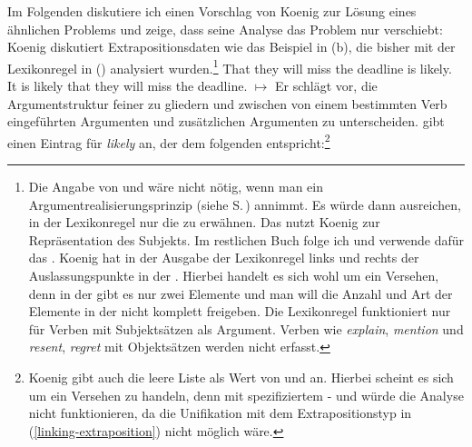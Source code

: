 Im Folgenden diskutiere ich einen Vorschlag von Koenig zur Lösung eines ähnlichen Problems
und zeige, dass seine Analyse das Problem nur verschiebt:
Koenig diskutiert Extrapositionsdaten wie das Beispiel in (b), die bisher mit der
Lexikonregel in () analysiert wurden.\footnote{\label{fn-Extrapositionslexikonregel}%
  Die Angabe von \subj und \comps wäre nicht nötig, wenn man ein
  Argumentrealisierungsprinzip (siehe S.\,\pageref{Prinzip-Argumentrealisierung-einfach})
  annimmt. Es würde dann ausreichen, in der Lexikonregel nur die \argstl zu erwähnen. Das \subjm nutzt Koenig zur
  Repräsentation des Subjekts. Im restlichen Buch folge ich \citet*[Abschnitt~4.3]{SWB2003a} und
  verwende dafür das \sprm. Koenig hat in der Ausgabe der Lexikonregel links und rechts der
   Auslassungspunkte in der \compsl. Hierbei handelt es sich wohl um ein Versehen, denn in
  der \argstl gibt es nur zwei Elemente und man will die Anzahl und Art der Elemente in der \compsl
  nicht komplett freigeben. Die Lexikonregel funktioniert nur für Verben mit Subjektsätzen als
  Argument. Verben wie \emph{explain}, \emph{mention} und \emph{resent}, \emph{regret} mit
  Objektsätzen \citep[--151]{ps2} werden nicht erfasst.%
}
\eal
\ex That they will miss the deadline is likely.
\ex It is likely that they will miss the deadline.
\zl
\ea
{} $\mapsto$ %
\z
Er schlägt vor, die Argumentstruktur feiner zu gliedern und zwischen von einem bestimmten
Verb eingeführten Argumenten und zusätzlichen Argumenten zu unterscheiden.
\citet[]{Koenig99a} gibt einen Eintrag für \emph{likely} an, der dem folgenden entspricht:\footnote{
  Koenig gibt auch die leere Liste als Wert von \subj und \comps an. Hierbei
  scheint es sich um ein Versehen zu handeln, denn mit spezifiziertem \subj- und \compsw
  würde die Analyse nicht funktionieren, da die Unifikation mit dem Extrapositionstyp in (\ref{linking-extraposition})
  nicht möglich wäre.%
}
